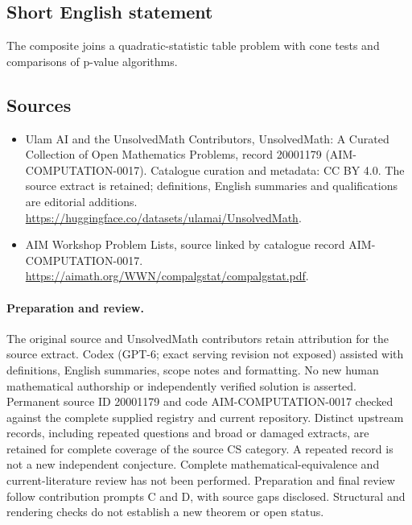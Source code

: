 \documentclass[11pt]{article}
\begin{document}
\subsection{Short English statement}
The composite joins a quadratic-statistic table problem with cone tests and comparisons of p-value algorithms.
\subsection{Sources}
\begin{itemize}
\item[\hypertarget{source:20001179:1}{S1}] Ulam AI and the UnsolvedMath Contributors, UnsolvedMath: A Curated Collection of Open Mathematics Problems, record 20001179 (AIM-COMPUTATION-0017). Catalogue curation and metadata: CC BY 4.0. The source extract is retained; definitions, English summaries and qualifications are editorial additions.
\url{https://huggingface.co/datasets/ulamai/UnsolvedMath}.
\item[\hypertarget{source:20001179:2}{S2}] AIM Workshop Problem Lists, source linked by catalogue record AIM-COMPUTATION-0017.
\url{https://aimath.org/WWN/compalgstat/compalgstat.pdf}.
\end{itemize}
\paragraph{Preparation and review.}
The original source and UnsolvedMath contributors retain attribution for the source extract. Codex (GPT-6; exact serving revision not exposed) assisted with definitions, English summaries, scope notes and formatting. No new human mathematical authorship or independently verified solution is asserted. Permanent source ID 20001179 and code AIM-COMPUTATION-0017 checked against the complete supplied registry and current repository. Distinct upstream records, including repeated questions and broad or damaged extracts, are retained for complete coverage of the source CS category. A repeated record is not a new independent conjecture. Complete mathematical-equivalence and current-literature review has not been performed. Preparation and final review follow contribution prompts C and D, with source gaps disclosed. Structural and rendering checks do not establish a new theorem or open status.
\label{end:20001179}
\end{document}
